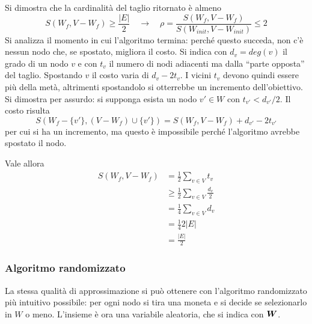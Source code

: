 Si dimostra che la cardinalità del taglio ritornato è almeno
$$
S \left( W_f, V-W_f \right)
\geq 
\frac{
    |E|
}{
    2
}
\quad
\to
\quad
\rho
= 
\frac{
S \left( W_f, V-W_f \right)
}{
S \left( W_{init} , V- W_{init} \right)
}
\leq 2
$$
Si analizza il momento in cui l'algoritmo termina: perché questo succeda, non c'è nessun nodo che, se spostato, migliora il costo.
Si indica con $d_v = deg(v)$ il grado di un nodo $v$ e con $t_v$ il numero di nodi adiacenti ma dalla ``parte opposta'' del taglio.
Spostando $v$ il costo varia di $
d_v - 2 t_v
$.
I vicini $t_v$ devono quindi essere più della metà, altrimenti spostandolo si otterrebbe un incremento dell'obiettivo. Si dimostra per assurdo: si supponga esista un nodo $
v' \in W
$ con $
t_{v'}
<
d_{v'}
/2
$. Il costo risulta
$$
    S \left( W_f -
    \{ v' \},
    \left( V-W_f \right)
    \cup
    \{ v' \}
    \right)
    =
    S \left( W_f, V-W_f \right)
    +
    d_{v'}
    -
    2 t_{v'}
$$
per cui si ha un incremento, ma questo è impossibile perché l'algoritmo avrebbe spostato il nodo.

Vale allora
\begin{align*}
    S \left( W_f, V-W_f \right)
    &= 
    \frac{1}{2}
    \sum_{v \in V} t_v
    \\
    &
    \geq
    \frac{1}{2}
    \sum_{v \in V}
    \frac{
    d_v
    }{2}
    \\
    &= 
    \frac{1}{4}
    \sum_{v \in V} d_v
    \\
    &=
    \frac{1}{4}
    2 |E|
    \\
    &=
    \frac{ |E| }{2}
\end{align*}

\subsubsection{Algoritmo randomizzato}

La stessa qualità di approssimazione si può ottenere con l'algoritmo randomizzato più intuitivo possibile: per ogni nodo si tira una moneta e si decide se selezionarlo in $W$ o meno.
L'insieme è ora una variabile aleatoria, che si indica con $\bm{W}$.

